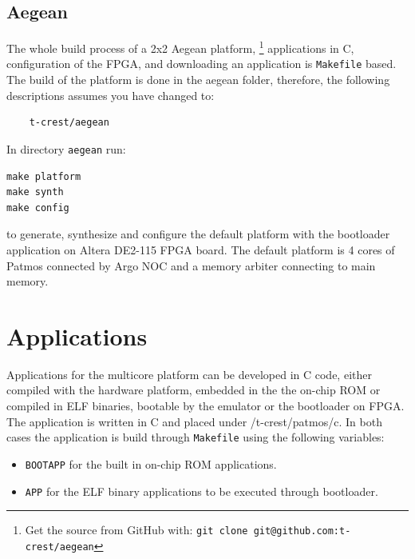 \documentclass[a4paper,fontsize=10pt,twoside,DIV15,BCOR12mm,headinclude=true,footinclude=false,pagesize,bibtotoc]{scrbook}
\newcommand{\code}[1]{{\texttt{#1}}}
\begin{document}
\subsection{Aegean}

The whole build process of a 2x2 Aegean platform,
\footnote{Get the source from GitHub with: \code{git clone git@github.com:t-crest/aegean}} 
applications %
in C, configuration of the FPGA, and downloading an application
is \code{Makefile} based. The build of the platform is done in the aegean folder,
therefore, the following descriptions assumes you have changed to:

\begin{verbatim}
	t-crest/aegean
\end{verbatim}

In directory \code{aegean} run:

\begin{verbatim}
make platform
make synth
make config
\end{verbatim}

to generate, synthesize and configure the default platform with the bootloader application 
on Altera DE2-115 FPGA board. The default platform is 4 cores of Patmos connected by Argo NOC 
and a memory arbiter connecting to main memory.


\section{Applications}

Applications for the multicore platform can be developed in C code, either 
compiled with the hardware platform, embedded in the the on-chip ROM
or compiled in ELF binaries, bootable by the emulator or the bootloader on FPGA.
The application is written in C and placed under /t-crest/patmos/c.
In both cases the application is build through \code{Makefile}
using the following variables:

\begin{itemize}
\item \code{BOOTAPP} for the built in on-chip ROM applications.
\item \code{APP} for the ELF binary applications to be executed through bootloader.
\end{itemize}

%
\end{document}
